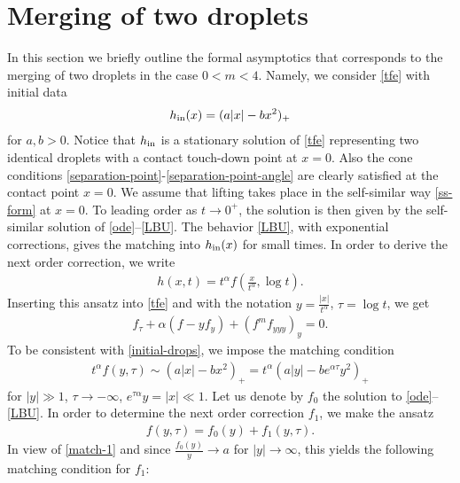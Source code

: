 \documentclass{article}%
\newcommand{\alp}{\alpha}
\begin{document}

 \appendix
 \section{Merging of two droplets} \label{sec-appendix}

In this section we briefly outline the formal asymptotics that corresponds to the merging
 of two droplets in the case $0 < m < 4$. Namely, we consider \eqref{tfe} 
with initial data %
\begin{align}\label{initial-drops}
  h_{\rm in}(x) = (a |x| - b x^{2})_+
\end{align}
for $a,b > 0$. Notice that $h_{\rm in}$ is a stationary solution of \eqref{tfe} 
representing two identical droplets with a contact touch-down point at
$x=0$. Also the cone conditions
\eqref{separation-point}-\eqref{separation-point-angle} are clearly satisfied at
the contact point $x = 0$. We assume that lifting takes place in the
self-similar way \eqref{ss-form} at $x=0$. To leading order as $t\to 0^+$, the
solution is then given by the self-similar solution of
\eqref{ode}--\eqref{LBU}. The behavior \eqref{LBU}, with exponential
corrections, gives the matching into $h_{\rm in}(x)$ for small
times. In order to derive the next order correction, we write
 \begin{align*}
   h(x,t) = t^\alp f \left( \frac{x}{t^\alp},\log t \right).
 \end{align*}
 Inserting this ansatz into \eqref{tfe} and with the notation 
$y = \frac {|x|}{t^\alp}$, $\tau = \log t$, we get
 \begin{align*}
    f_{\tau}+\alpha (f - yf_{y}) + (f^{m}f_{yyy})_{y} = 0.
 \end{align*}
 To be consistent with \eqref{initial-drops}, we impose the
 matching condition%
  \begin{align} \label{match-1} %
    t^\alp  f( y,\tau) \sim (a |x| -bx^{2})_+ = 
t^\alp (a |y| - b    e^{\alp\tau}y^{2})_+
 \end{align}
 for $|y|\gg 1$, $\tau\to -\infty$, $e^{\tau \alp} y = |x| \ll 1$. Let us denote
 by $f_0$ the solution to \eqref{ode}--\eqref{LBU}. In order to determine the next
 order correction $f_1$, we make the ansatz
 \begin{align*}
    f(y,\tau) = f_0(y) + f_1(y,\tau).
 \end{align*}
 In view of \eqref{match-1} and since $\frac{f_0(y)}{y} \to a$ for
 $|y| \to \infty$, this yields the following matching condition for $f_1$:
\end{document}
